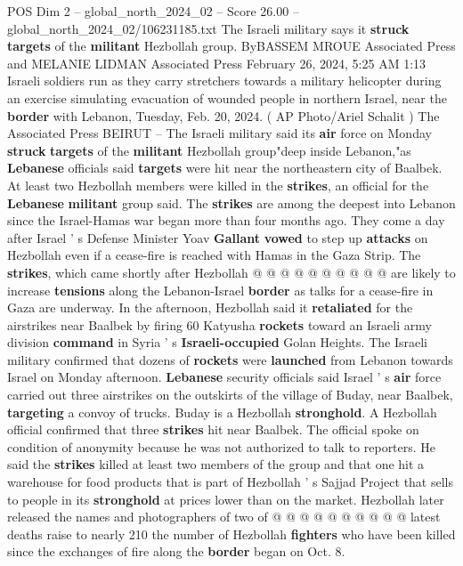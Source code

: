 \begin{textsample}{POS Dim 2 – global\_north\_2024\_02 – Score 26.00 – global\_north\_2024\_02/106231185.txt}  \label{ex:f2_pos_265}
The Israeli military says it \textbf{struck} \textbf{targets} of the \textbf{militant} Hezbollah group.
ByBASSEM MROUE Associated Press and MELANIE LIDMAN Associated Press February 26, 2024, 5:25 AM 1:13 Israeli soldiers run as they carry stretchers towards a military helicopter during an exercise simulating evacuation of wounded people in northern Israel, near the \textbf{border} with Lebanon, Tuesday, Feb. 20, 2024. ( AP Photo/Ariel Schalit ) The Associated Press BEIRUT -- The Israeli military said its \textbf{air} force on Monday \textbf{struck} \textbf{targets} of the \textbf{militant} Hezbollah group"deep inside Lebanon,"as \textbf{Lebanese} officials said \textbf{targets} were hit near the northeastern city of Baalbek.
At least two Hezbollah members were killed in the \textbf{strikes}, an official for the \textbf{Lebanese} \textbf{militant} group said.
The \textbf{strikes} are among the deepest into Lebanon since the Israel-Hamas war began more than four months ago.
They come a day after Israel ' s Defense Minister Yoav \textbf{Gallant} \textbf{vowed} to step up \textbf{attacks} on Hezbollah even if a cease-fire is reached with Hamas in the Gaza Strip.
The \textbf{strikes}, which came shortly after Hezbollah @ @ @ @ @ @ @ @ @ @ are likely to increase \textbf{tensions} along the Lebanon-Israel \textbf{border} as talks for a cease-fire in Gaza are underway.
In the afternoon, Hezbollah said it \textbf{retaliated} for the airstrikes near Baalbek by firing 60 Katyusha \textbf{rockets} toward an Israeli army division \textbf{command} in Syria ' s \textbf{Israeli-occupied} Golan Heights.
The Israeli military confirmed that dozens of \textbf{rockets} were \textbf{launched} from Lebanon towards Israel on Monday afternoon. \textbf{Lebanese} security officials said Israel ' s \textbf{air} force carried out three airstrikes on the outskirts of the village of Buday, near Baalbek, \textbf{targeting} a convoy of trucks.
Buday is a Hezbollah \textbf{stronghold}.
A Hezbollah official confirmed that three \textbf{strikes} hit near Baalbek.
The official spoke on condition of anonymity because he was not authorized to talk to reporters.
He said the \textbf{strikes} killed at least two members of the group and that one hit a warehouse for food products that is part of Hezbollah ' s Sajjad Project that sells to people in its \textbf{stronghold} at prices lower than on the market.
Hezbollah later released the names and photographers of two of @ @ @ @ @ @ @ @ @ @ latest deaths raise to nearly 210 the number of Hezbollah \textbf{fighters} who have been killed since the exchanges of fire along the \textbf{border} began on Oct. 8.

\end{textsample}
